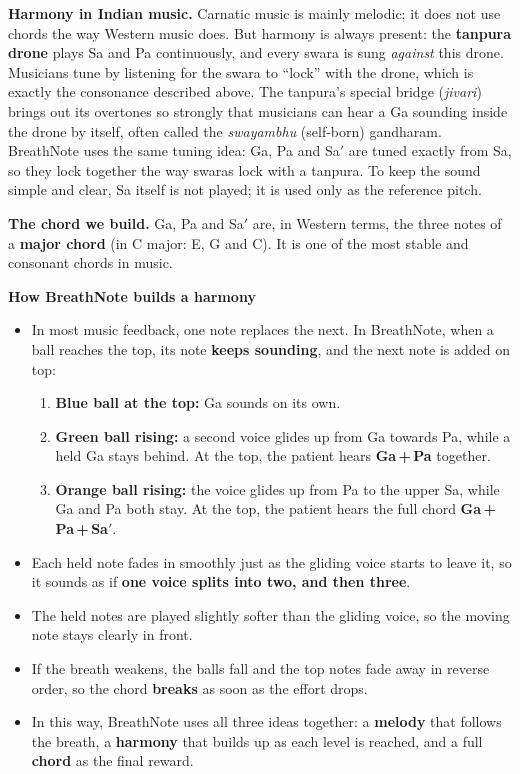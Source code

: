 \documentclass[12pt,a4paper]{article}
\newcommand{\Sah}{Sa\ensuremath{'}}     %
\begin{document}
\textbf{Harmony in Indian music.} Carnatic music is mainly melodic; it does not use chords the way Western music does. But harmony is always present: the \textbf{tanpura drone} plays Sa and Pa continuously, and every swara is sung \emph{against} this drone. Musicians tune by listening for the swara to ``lock'' with the drone, which is exactly the consonance described above. The tanpura's special bridge (\emph{jivari}) brings out its overtones so strongly that musicians can hear a Ga sounding inside the drone by itself, often called the \emph{swayambhu} (self-born) gandharam. BreathNote uses the same tuning idea: Ga, Pa and \Sah{} are tuned exactly from Sa, so they lock together the way swaras lock with a tanpura. To keep the sound simple and clear, Sa itself is not played; it is used only as the reference pitch.

\textbf{The chord we build.} Ga, Pa and \Sah{} are, in Western terms, the three notes of a \textbf{major chord} (in C major: E, G and C). It is one of the most stable and consonant chords in music.

\textbf{How BreathNote builds a harmony}
\begin{itemize}
  \item In most music feedback, one note replaces the next. In BreathNote, when a ball reaches the top, its note \textbf{keeps sounding}, and the next note is added on top:
  \begin{enumerate}
    \item \textbf{Blue ball at the top:} Ga sounds on its own.
    \item \textbf{Green ball rising:} a second voice glides up from Ga towards Pa, while a held Ga stays behind. At the top, the patient hears \textbf{Ga\,+\,Pa} together.
    \item \textbf{Orange ball rising:} the voice glides up from Pa to the upper Sa, while Ga and Pa both stay. At the top, the patient hears the full chord \textbf{Ga\,+\,Pa\,+\,\Sah}.
  \end{enumerate}
  \item Each held note fades in smoothly just as the gliding voice starts to leave it, so it sounds as if \textbf{one voice splits into two, and then three}.
  \item The held notes are played slightly softer than the gliding voice, so the moving note stays clearly in front.
  \item If the breath weakens, the balls fall and the top notes fade away in reverse order, so the chord \textbf{breaks} as soon as the effort drops.
\end{itemize}
\begin{itemize}
  \item In this way, BreathNote uses all three ideas together: a \textbf{melody} that follows the breath, a \textbf{harmony} that builds up as each level is reached, and a full \textbf{chord} as the final reward.
\end{itemize}
\end{document}
